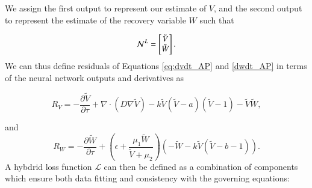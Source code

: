 We assign the first output to represent our estimate of $V$, and the second output to represent the estimate of the recovery variable $W$ such that

\begin{equation}
    \mathcal{N}^L=\begin{bmatrix}\Tilde{V}\\
    \Tilde{W}\\
    \end{bmatrix}.
\end{equation}
We can thus define residuals of Equations \eqref{eq:dvdt_AP} and \eqref{dwdt_AP} in terms of the neural network outputs and derivatives as

\begin{equation}
\label{eq:R_V}
R_V=-\frac{\partial \tilde{V}}{\partial \tau}+\nabla\cdot(D\nabla \tilde{V})-k \tilde{V}(\tilde{V}-a)(\tilde{V}-1)-\tilde{V} \tilde{W},
\end{equation}

and
\begin{equation}
\label{eq:R_W}
R_W=-\frac{\partial \tilde{W}}{\partial \tau}+\left(\epsilon+\frac{\mu_1 \tilde{W}}{\tilde{V}+\mu_2}\right)(-\tilde{W}-k \tilde{V}(\tilde{V}-b-1)).
\end{equation}
A hybdrid loss function $\mathcal{L}$ can then be defined as a combination of components which ensure both data fitting and consistency with the governing equations:

